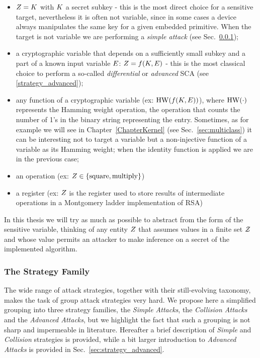 \begin{itemize}
\item $Z = K$ with $K$ a secret subkey - this is the most direct choice for a sensitive target, nevertheless it is often not variable, since in some cases a device always manipulates the same key for a given embedded primitive. When the target is not variable we are performing a \emph{simple attack} (see Sec.~\ref{sec:strategies});
\item a cryptographic variable that depends on a sufficiently small subkey and a part of a known input variable $E$: $Z = f(K,E)$ - this is the most classical choice to perform a so-called \emph{differential} or \emph{advanced} SCA (see \ref{strategy_advanced});
\item any function of a cryptographic variable (ex: $\mathrm{HW}(f(K,E))$), where $\mathrm{HW}(\cdot)$ represents the Hamming weight operation, \ie the operation that counts the number of 1's in the binary string representing the entry. Sometimes, as for example we will see in Chapter~\ref{ChapterKernel} (see Sec.~\ref{sec:multiclass}) it can be interesting not to target a variable but a non-injective function of a variable as its Hamming weight; when the identity function is applied we are in the previous case;
\item an operation (ex: $Z \in \{\mathrm{square}, \mathrm{multiply}\}$)
\item a register (ex: $Z$ is the register used to store results of intermediate operations in a Montgomery ladder implementation of RSA)
\end{itemize}
In this thesis we will try as much as possible to abstract from the form of the sensitive variable, thinking of any entity $Z$ that assumes values in a finite set $\mathcal{Z}$ and whose value permits an attacker to make inference on a secret of the implemented algorithm.

\subsubsection{The Strategy Family}\label{sec:strategies}
The wide range of attack strategies, together with their still-evolving taxonomy, makes the task of group attack strategies very hard. We propose here a simplified grouping into three strategy families, the \emph{Simple Attacks}, the \emph{Collision Attacks} and the \emph{Advanced Attacks}, but we highlight the fact that such a grouping is not sharp and impermeable in literature. Hereafter a brief description of \emph{Simple} and \emph{Collision} strategies is provided, while a bit larger introduction to \emph{Advanced Attacks} is provided in Sec.~\ref{sec:strategy_advanced}. 
